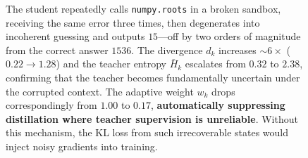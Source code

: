 \begin{figure}[t]
\begin{tcolorbox}
\begin{tcolorbox}[
  colback=red!3, colframe=red!50!black, boxrule=0.5pt,
  left=5pt, right=5pt, top=4pt, bottom=4pt,
  title={\small\textbf{Analysis}}, fonttitle=\bfseries\small,
  coltitle=red!50!black, colbacktitle=red!8
]
\small
The student repeatedly calls \texttt{numpy.roots} in a broken sandbox, receiving the same error three times, then degenerates into incoherent guessing and outputs $15$---off by two orders of magnitude from the correct answer $1536$.
The divergence $d_k$ increases ${\sim}6{\times}$ ($0.22 \to 1.28$) and the teacher entropy $\bar{H}_k$ escalates from $0.32$ to $2.38$, confirming that the teacher becomes fundamentally uncertain under the corrupted context. The adaptive weight $w_k$ drops correspondingly from $1.00$ to $0.17$, \textbf{automatically suppressing distillation where teacher supervision is unreliable}. Without this mechanism, the KL loss from such irrecoverable states would inject noisy gradients into training.
\end{tcolorbox}



\end{tcolorbox}


\label{fig:case-study-b}
\end{figure}


































